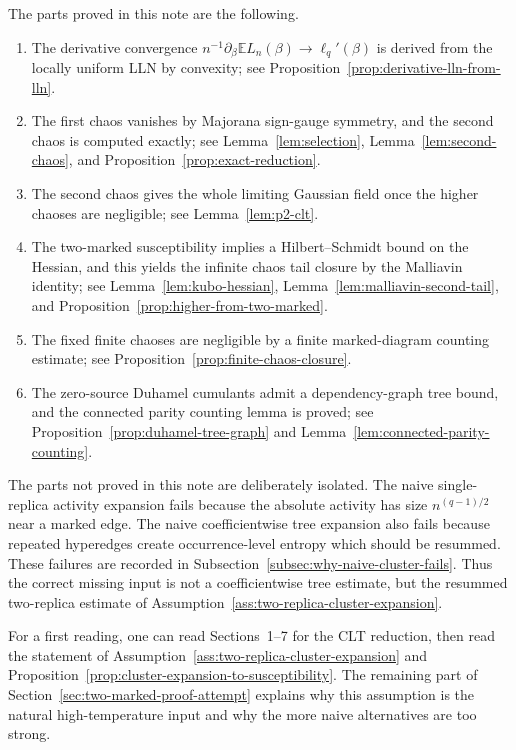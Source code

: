 \documentclass[11pt]{article}
\newcommand{\E}{\mathbb{E}}
\begin{document}
The parts proved in this note are the following.
\begin{enumerate}[label=\textup{(\roman*)},leftmargin=*]
  \item The derivative convergence
  $n^{-1}\partial_\beta\E L_n(\beta)\to\ell_q'(\beta)$ is derived from the
  locally uniform LLN by convexity; see Proposition~\ref{prop:derivative-lln-from-lln}.

  \item The first chaos vanishes by Majorana sign-gauge symmetry, and the second
  chaos is computed exactly; see Lemma~\ref{lem:selection},
  Lemma~\ref{lem:second-chaos}, and Proposition~\ref{prop:exact-reduction}.

  \item The second chaos gives the whole limiting Gaussian field once the higher
  chaoses are negligible; see Lemma~\ref{lem:p2-clt}.

  \item The two-marked susceptibility implies a Hilbert--Schmidt bound on the
  Hessian, and this yields the infinite chaos tail closure by the Malliavin
  identity; see Lemma~\ref{lem:kubo-hessian},
  Lemma~\ref{lem:malliavin-second-tail}, and
  Proposition~\ref{prop:higher-from-two-marked}.

  \item The fixed finite chaoses are negligible by a finite marked-diagram
  counting estimate; see Proposition~\ref{prop:finite-chaos-closure}.

  \item The zero-source Duhamel cumulants admit a dependency-graph tree bound,
  and the connected parity counting lemma is proved; see
  Proposition~\ref{prop:duhamel-tree-graph} and
  Lemma~\ref{lem:connected-parity-counting}.
\end{enumerate}

The parts not proved in this note are deliberately isolated.  The naive
single-replica activity expansion fails because the absolute activity has size
$n^{(q-1)/2}$ near a marked edge.  The naive coefficientwise tree expansion also
fails because repeated hyperedges create occurrence-level entropy which should
be resummed.  These failures are recorded in
Subsection~\ref{subsec:why-naive-cluster-fails}.  Thus the correct missing input
is not a coefficientwise tree estimate, but the resummed two-replica estimate of
Assumption~\ref{ass:two-replica-cluster-expansion}.

For a first reading, one can read Sections~1--7 for the CLT reduction, then read
the statement of Assumption~\ref{ass:two-replica-cluster-expansion} and
Proposition~\ref{prop:cluster-expansion-to-susceptibility}.  The remaining part
of Section~\ref{sec:two-marked-proof-attempt} explains why this assumption is
the natural high-temperature input and why the more naive alternatives are too
strong.
\end{document}
